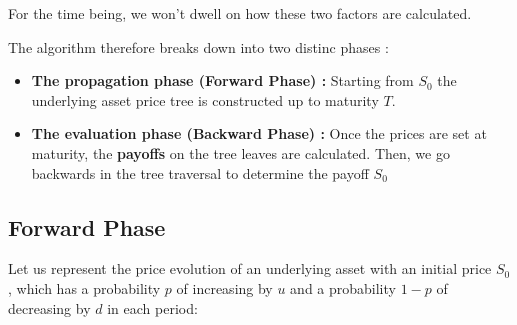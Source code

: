 \remark For the time being, we won't dwell on how these two factors are calculated.

The algorithm therefore breaks down into two distinc phases :
\begin{itemize}
    \item \textbf{The propagation phase (Forward Phase) :} Starting from $S_0$ the underlying asset price tree is constructed up to maturity $T$.
    \item \textbf{The evaluation phase (Backward Phase) :} Once the prices are set at maturity, the \textbf{payoffs} on the tree leaves are calculated.
    Then, we go backwards in the tree traversal to determine the payoff $S_0$
\end{itemize}

\pagebreak

\subsection{Forward Phase}
Let us represent the price evolution of an underlying asset with an initial price $S_0$, which has a probability $p$ of increasing by $u$ and a probability $1-p$ of decreasing by $d$ in each period:
\def\mallevel{2}
\def\ratiox{3.5} 
\def\ratioy{2.0} 

\begin{center}
\end{center}



